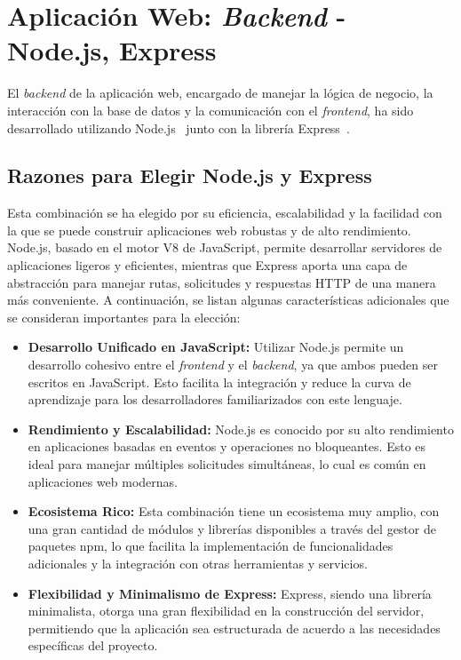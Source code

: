 \clearpage
\section{Aplicación Web: \textit{Backend} - Node.js, Express}\label{sec:backend_section}

El \textit{backend} de la aplicación web, encargado de manejar la lógica de negocio, la interacción con la base de datos y la comunicación con el \textit{frontend}, ha sido desarrollado utilizando Node.js~\cite{nodejs} junto con la librería Express~\cite{express}.

\subsection{Razones para Elegir Node.js y Express}

Esta combinación se ha elegido por su eficiencia, escalabilidad y la facilidad con la que se puede construir aplicaciones web robustas y de alto rendimiento. Node.js, basado en el motor V8 de JavaScript, permite desarrollar servidores de aplicaciones ligeros y eficientes, mientras que Express aporta una capa de abstracción para manejar rutas, solicitudes y respuestas HTTP de una manera más conveniente. A continuación, se listan algunas características adicionales que se consideran importantes para la elección:

\begin{itemize}
    \item \textbf{Desarrollo Unificado en JavaScript:} Utilizar Node.js permite un desarrollo cohesivo entre el \textit{frontend} y el \textit{backend}, ya que ambos pueden ser escritos en JavaScript. Esto facilita la integración y reduce la curva de aprendizaje para los desarrolladores familiarizados con este lenguaje.

    \item \textbf{Rendimiento y Escalabilidad:} Node.js es conocido por su alto rendimiento en aplicaciones basadas en eventos y operaciones no bloqueantes. Esto es ideal para manejar múltiples solicitudes simultáneas, lo cual es común en aplicaciones web modernas.

    \item \textbf{Ecosistema Rico:} Esta combinación tiene un ecosistema muy amplio, con una gran cantidad de módulos y librerías disponibles a través del gestor de paquetes npm, lo que facilita la implementación de funcionalidades adicionales y la integración con otras herramientas y servicios.

    \item \textbf{Flexibilidad y Minimalismo de Express:} Express, siendo una librería minimalista, otorga una gran flexibilidad en la construcción del servidor, permitiendo que la aplicación sea estructurada de acuerdo a las necesidades específicas del proyecto.
\end{itemize}

